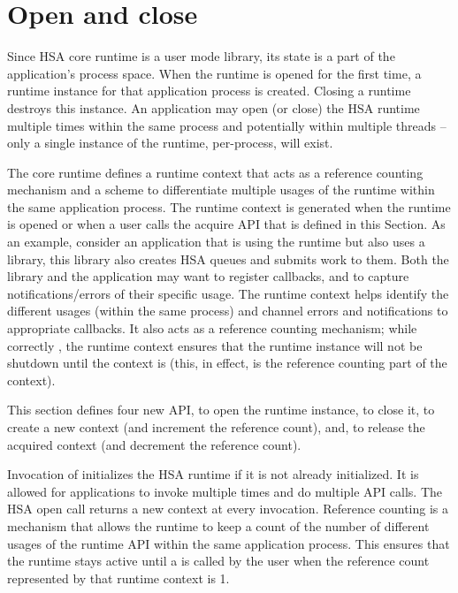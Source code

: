 \begin{DIFnomarkup}
\hypertarget{init}{}\section{Open and close
}\label{init}
\end{DIFnomarkup}

Since HSA core runtime is a user mode library, its state is a part
of the application's process space. When the runtime is opened for
the first time, a runtime instance for that application process is
created. Closing a runtime destroys this instance. An application
may open (or close) the HSA runtime multiple times within the same
process and potentially within multiple threads -- only a
single instance of the runtime, per-process, will exist.

The core runtime defines a runtime context that acts as a reference
counting mechanism and a scheme to differentiate multiple usages of
the runtime within the same application process. The runtime context
is generated when the runtime is opened or when a
user calls the acquire API that is defined in this Section. As an
example, consider an application that is using the runtime but also
uses a library, this library also creates HSA queues and submits
work to them. Both the library and the application may want to register
callbacks, and to capture notifications/errors of their specific
usage. The runtime context helps identify the different usages (within
the same process) and channel errors and notifications to
appropriate callbacks. It also acts as a reference counting
mechanism; while correctly , the runtime context
ensures that the runtime instance will not be shutdown until the
context is  (this, in effect, is the reference
counting part of the context).

This section defines four new API,  to open the
runtime instance,  to close it,
 to create a new context (and increment
the reference count), and,  to release
the acquired context (and decrement the reference count).

Invocation of  initializes the HSA runtime if it is
not already initialized. It is allowed for applications to invoke
 multiple times and do multiple 
API calls. The HSA open call returns a new context at every
invocation.  Reference counting is a mechanism that allows the
runtime to keep a count of the number of different usages of the
runtime API within the same application process. This ensures that
the runtime stays active until a  is called by the
user when the reference count represented by that runtime context is
1.

